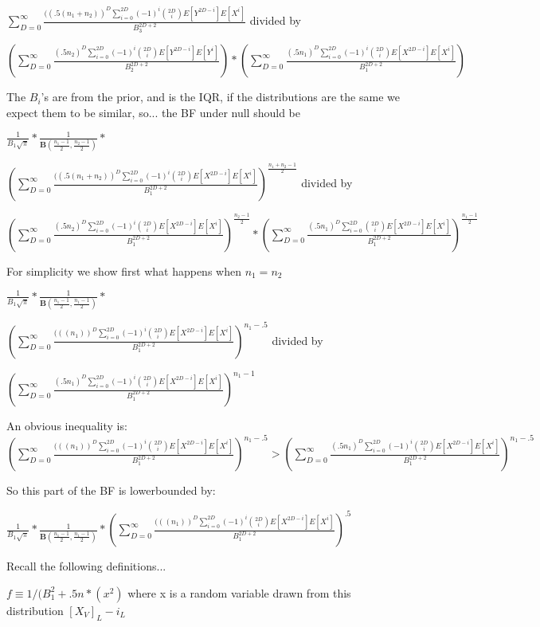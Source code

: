 \documentclass[11pt]{article}
\begin{document}
$\sum_{D=0}^\infty \frac{((.5(n_1 + n_2))^D \sum_{i=0}^{2D} (-1)^i \binom{2D}{i}E[Y^{2D-i}]E[X^{i}]}{B_3^{2D+2}}$ divided by 


$ (\sum_{D=0}^\infty \frac{(.5n_2)^D \sum_{i=0}^{2D} (-1)^i \binom{2D}{i}E[Y^{2D-i}]E[Y^{i}]}{B_2^{2D+2}}) * (\sum_{D=0}^\infty \frac{(.5n_1)^D \sum_{i=0}^{2D} (-1)^i \binom{2D}{i}E[X^{2D-i}]E[X^{i}]}{B_1^{2D+2}}) $

The $B_i$'s are from the prior, and is the IQR, if the distributions are the same we expect them to be similar, so... the BF under null should be

$\frac{1}{B_1 \sqrt{\pi}} * \frac{1}{ \mathbf{B}(\frac{n_1 -1}{2}, \frac{n_2 -1}{2})} * $

$(\sum_{D=0}^\infty \frac{((.5(n_1 + n_2))^D \sum_{i=0}^{2D} (-1)^i \binom{2D}{i}E[X^{2D-i}]E[X^{i}]}{B_1^{2D+2}})^{\frac{n_1+n_2 - 1}{2}}$ divided by 


$ (\sum_{D=0}^\infty \frac{(.5n_2)^D \sum_{i=0}^{2D} (-1)^i \binom{2D}{i}E[X^{2D-i}]E[X^{i}]}{B_1^{2D+2}})^{\frac{n_2 - 1}{2}} * (\sum_{D=0}^\infty \frac{(.5n_1)^D \sum_{i=0}^{2D} \binom{2D}{i}E[X^{2D-i}]E[X^{i}]}{B_1^{2D+2}})^{\frac{n_1 - 1}{2}} $

For simplicity we show first what happens when $n_1 = n_2$

$\frac{1}{B_1 \sqrt{\pi}} * \frac{1}{ \mathbf{B}(\frac{n_1 -1}{2}, \frac{n_1 -1}{2})} * $

$(\sum_{D=0}^\infty \frac{(((n_1))^D \sum_{i=0}^{2D} (-1)^i \binom{2D}{i}E[X^{2D-i}]E[X^{i}]}{B_1^{2D+2}})^{n_1- .5}$ divided by 

$ (\sum_{D=0}^\infty \frac{(.5n_1)^D \sum_{i=0}^{2D} (-1)^i \binom{2D}{i}E[X^{2D-i}]E[X^{i}]}{B_1^{2D+2}})^{n_1- 1} $

An obvious inequality is: $(\sum_{D=0}^\infty \frac{(((n_1))^D \sum_{i=0}^{2D} (-1)^i \binom{2D}{i}E[X^{2D-i}]E[X^{i}]}{B_1^{2D+2}})^{n_1- .5} > (\sum_{D=0}^\infty \frac{(.5n_1)^D \sum_{i=0}^{2D} (-1)^i \binom{2D}{i}E[X^{2D-i}]E[X^{i}]}{B_1^{2D+2}})^{n_1- .5} $

So this part of the BF is lowerbounded by:

$\frac{1}{B_1 \sqrt{\pi}} * \frac{1}{ \mathbf{B}(\frac{n_1 -1}{2}, \frac{n_1 -1}{2})} * (\sum_{D=0}^\infty \frac{(((n_1))^D \sum_{i=0}^{2D} (-1)^i \binom{2D}{i}E[X^{2D-i}]E[X^{i}]}{B_1^{2D+2}})^{.5} $

Recall the following definitions...

$f \equiv 1 / (B_1^2 + .5n*(x^2)$ where x is a random variable drawn from this distribution $[X_V]_{L} - i_L$
\end{document}
